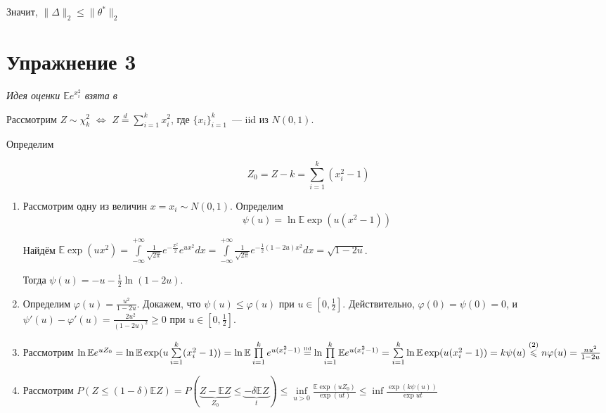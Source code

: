 \documentclass[a4paper]{article}
\newcommand{\E}{\mathbb{E}}
\begin{document}
Значит, $\|\Delta\|_2\leqslant \|\theta^*\|_2$
\section*{Упражнение 3}
{\em Идея оценки $\E e^{x_i^2}$ взята в \cite{massart}}

Рассмотрим $Z\sim\chi^2_k$ $\Leftrightarrow$ $Z\overset{d}{=}\sum\limits_{i=1}^k x_i^2$, где $\{x_i\}_{i=1}^k$~--- iid из $N(0,1)$.

Определим

$$Z_0=Z-k=\sum\limits_{i=1}^k(x_i^2-1)$$

\begin{enumerate}
	\item Рассмотрим одну из величин $x=x_i\sim N(0,1)$. Определим
$$
\psi(u)=\ln\E\exp(u(x^2-1))
$$

Найдём $\E \exp(ux^2)=\int\limits_{-\infty}^{+\infty}\frac{1}{\sqrt{2\pi}}e^{-\frac{x^2}{2}}e^{ux^2}dx=\int\limits_{-\infty}^{+\infty}\frac{1}{\sqrt{2\pi}}e^{-\frac{1}{2}(1-2u)x^2}dx=\sqrt{1-2u}$.

Тогда $\psi(u)=-u-\frac{1}{2}\ln(1-2u)$.

\item Определим $\varphi(u)=\frac{u^2}{1-2u}$. Докажем, что $\psi(u)\leqslant \varphi(u)$ при $u\in[0,\frac{1}{2}]$. Действительно, $\varphi(0)=\psi(0)=0$, и $\psi'(u)-\varphi'(u)=\frac{2u^2}{(1-2u)^2}\geqslant 0$ при $u\in[0,\frac{1}{2}]$.
\item Рассмотрим $\ln \E e^{uZ_0}=\ln\E \exp(u\sum\limits_{i=1}^k(x_i^2-1))=\ln\E\prod\limits_{i=1}^ke^{u(x_i^2-1)}\overset{\mbox{\tiny iid}}{=}\ln\prod\limits_{i=1}^k\E e^{u(x_i^2-1)}=\sum\limits_{i=1}^k\ln\E\exp(u(x_i^2-1))=k\psi(u)\overset{(2)}{\leqslant}n\varphi(u)=\frac{nu^2}{1-2u}$
\item Рассмотрим $P(Z\leqslant (1-\delta)\E Z)=P(\underbrace{Z-\E Z}_{Z_0}\leqslant \underbrace{-\delta\E Z}_t)\leqslant\inf\limits_{u>0}\frac{\E \exp(uZ_0)}{\exp(ut)}\leqslant\inf \frac{\exp(k\psi(u))}{\exp{ut}}$
\end{enumerate}
\end{document}

